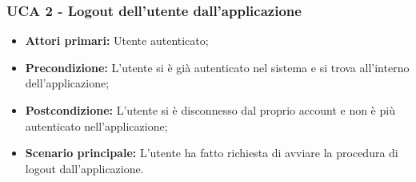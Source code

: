 \newpage
\subsubsection{UCA 2 - Logout dell'utente dall'applicazione}%
\begin{itemize}
\item \textbf{Attori primari:} Utente autenticato;
\item \textbf{Precondizione:} L'utente si è già autenticato nel sistema e si trova all'interno dell'applicazione;
\item \textbf{Postcondizione:}  L'utente si è disconnesso dal proprio account e non è più autenticato nell'applicazione;
\item \textbf{Scenario principale:} L'utente ha fatto richiesta di avviare la procedura di logout dall'applicazione.
\end{itemize}